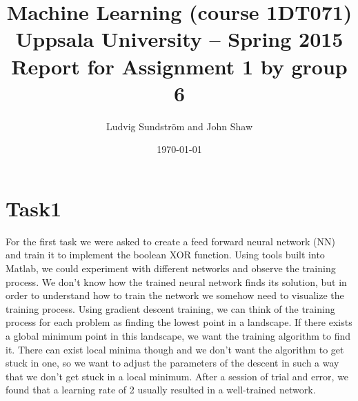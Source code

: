 \documentclass[a4paper]{article}
\title{Machine Learning (course 1DT071)
Uppsala University – Spring 2015
Report for Assignment 1 by group 6}
\author{Ludvig Sundstr\"{o}m and John Shaw}
\date{\today}
\begin{document}
\maketitle

\section{Task1}

For the first task we were asked to create a feed forward neural network (NN) and 
train it to implement the boolean XOR function. Using tools built into Matlab, we 
could experiment with different networks and observe the training process. 
We don't know how the trained neural network finds its solution, 
but in order to understand how to train the network we somehow need to 
visualize the training process. 
Using gradient descent training, we can think of the training process for each problem 
as finding the lowest point in a landscape. If there exists a global minimum point in 
this landscape, we want the training algorithm to find it. There can exist local minima 
though and we don't want the algorithm to get stuck in one, so we want to 
adjust the parameters of the descent in such a way that we don't get stuck in a local 
minimum. After a session of trial and error, we found that a learning rate of 2 
usually resulted in a well-trained network. 
\end{document}
